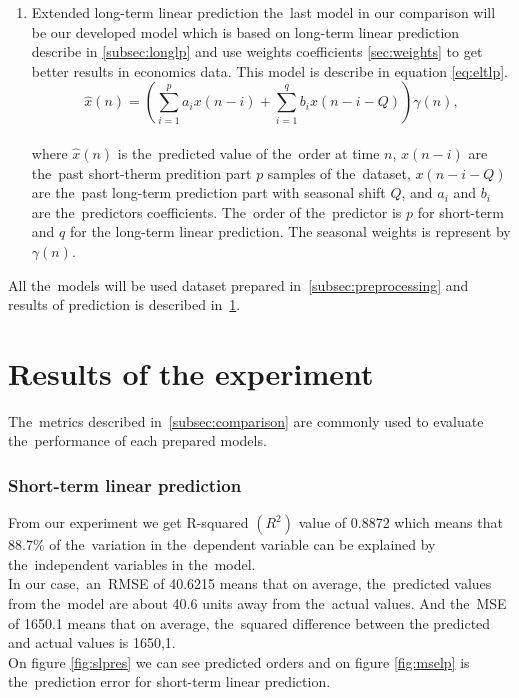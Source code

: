 \begin{enumerate}
    \item Extended long-term linear prediction
     the~last model in our comparison will be our developed model which is based on long-term linear prediction
    describe in \ref{subsec:longlp} and use weights coefficients \ref{sec:weights} to get better results in
    economics data. This model is describe in equation \ref{eq:eltlp}.
    \begin{equation}
        \hat{x}(n) = \left(\sum_{i=1}^{p} a_i x(n-i) + \sum_{i=1}^{q} b_i x(n-i-Q)\right) \gamma(n),
    \end{equation}
    \\
    where $\hat{x}(n)$ is the~predicted value of the~order at time $n$, $x(n-i)$ are the~past short-therm predition part $p$ samples of the~dataset, $x(n-i-Q)$ are the~past long-term prediction part with seasonal shift $Q$, and $a_i$ and $b_i$ are the~predictors coefficients. The~order of the~predictor is $p$ for short-term and $q$ for the long-term linear prediction. The seasonal weights is represent by $\gamma(n)$.\\
\end{enumerate}
All the~models will be used dataset prepared in~\ref{subsec:preprocessing} and results of prediction is
described in~\ref{subsec:experimentResults}.
\section{Results of the experiment}\label{subsec:experimentResults}
    The~metrics described in~\ref{subsec:comparison} are commonly used to evaluate
     the~performance of each prepared models.
    \subsubsection{Short-term linear prediction} \label{subsec:res_slp}
    From our experiment we get R-squared $(R^2)$ value of 0.8872 which means that
    88.7\% of the~variation in the~dependent variable can be explained
    by the~independent variables in the~model.\\
    In our case,~an~RMSE of 40.6215 means that on average, the~predicted values
    from the~model are about 40.6 units away from the~actual values.
    And the~MSE of 1650.1 means that on average, the~squared difference between the
    predicted and actual values is 1650,1.\\
    On figure \ref{fig:slpres} we can see predicted orders and on figure \ref{fig:mselp}
    is the~prediction error for short-term linear prediction.
